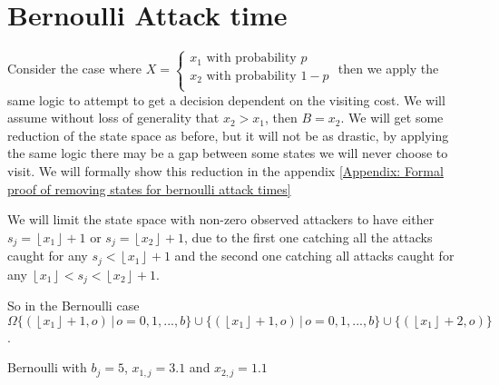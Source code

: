 \documentclass[a4paper,10pt]{article}
\newcommand{\floor}[1]{\left \lfloor #1 \right \rfloor}
\theoremstyle{definition}
\theoremstyle{definition}
\theoremstyle{remark}
\theoremstyle{definition}
\begin{document}
\section{Bernoulli Attack time}
Consider the case where $X=\begin{cases}
x_{1} \text{ with probability } p \\
x_{2} \text{ with probability } 1-p \\
\end{cases}$ then we apply the same logic to attempt to get a decision dependent on the visiting cost. We will assume without loss of generality that $x_{2} > x_{1}$, then $B=x_{2}$. We will get some reduction of the state space as before, but it will not be as drastic, by applying the same logic there may be a gap between some states we will never choose to visit.
We will formally show this reduction in the appendix \ref{Appendix: Formal proof of removing states for bernoulli attack times}

We will limit the state space with non-zero observed attackers to have either $s_{j}=\floor{x_{1}}+1$ or $s_{j}=\floor{x_{2}}+1$, due to the first one catching all the attacks caught for any $s_{j}<\floor{x_{1}}+1$ and the second one catching all attacks caught for any $\floor{x_{1}}<s_{j}<\floor{x_{2}}+1$.

So in the Bernoulli case $\Omega \{(\floor{x_{1}}+1,o) \, | \, o=0,1,...,b \} \cup \{(\floor{x_{1}}+1,o) \, | \, o=0,1,...,b \} \cup \{(\floor{x_{1}}+2,o) \}$.

\begin{myfigure}
\begin{center}
\end{center}
\caption{Bernoulli with $b_{j}=5$, $x_{1,j}=3.1$ and $x_{2,j}=1.1$}
\end{myfigure}
\end{document}
